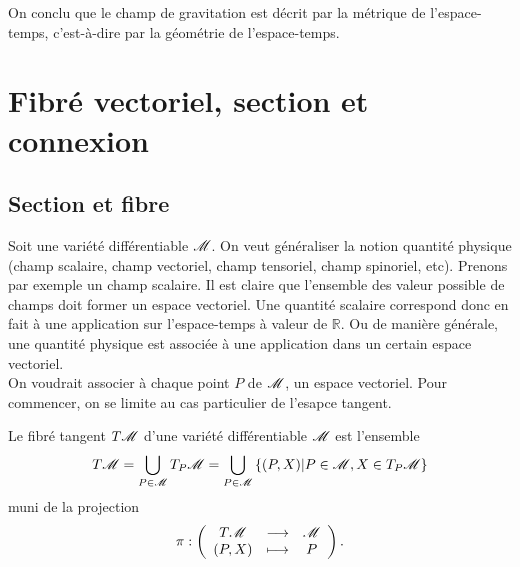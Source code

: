 \documentclass[a4paper,11pt]{report}
\begin{document}
                On conclu que le champ de gravitation est décrit par la métrique de l'espace-temps, c'est-à-dire par la géométrie de l'espace-temps.
            
        \section{Fibré vectoriel, section et connexion}
        
            \subsection{Section et fibre}
        
                Soit une variété différentiable $\mathscr{M}$. On veut généraliser la notion quantité physique (champ scalaire, champ vectoriel, champ tensoriel, champ spinoriel, etc). Prenons par exemple un champ scalaire. Il est claire que l'ensemble des valeur possible de champs doit former un espace vectoriel. Une quantité scalaire correspond donc en fait à une application sur l'espace-temps à valeur de $\mathbb{R}$. Ou de manière générale, une quantité physique est associée à une application dans un certain espace vectoriel.\\
                
                On voudrait associer à chaque point $P$ de $\mathscr{M}$, un espace vectoriel. Pour commencer, on se limite au cas particulier de l'esapce tangent.
                
                \begin{defn}
                    Le fibré tangent $T\mathscr{M}$ d'une variété différentiable $\mathscr{M}$ est l'ensemble
                    \begin{equation}
                        T\mathscr{M} = \bigcup_{P\in\mathscr{M}}T_P\mathscr{M} = \bigcup_{P\in\mathscr{M}}\left\{ (P,X)|P\in\mathscr{M}, X\in T_P\mathscr{M} \right\}
                    \end{equation}
                    muni de la projection
                    \begin{equation}
                    \pi:\left(
                    \begin{array}{ccc}
                        T\mathscr{M} & \longrightarrow & \mathscr{M} \\
                        (P,X) & \longmapsto & P
                    \end{array}
                    \right).
                    \end{equation}
                \end{defn}
                
\end{document}
